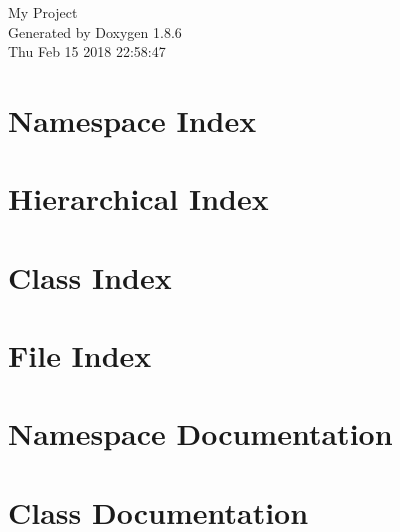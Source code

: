 \documentclass[twoside]{book}
\newcommand{\clearemptydoublepage}{%
  \newpage{\pagestyle{empty}\cleardoublepage}%
}
\begin{document}
\hypersetup{pageanchor=false}
\begin{titlepage}
\vspace*{7cm}
\begin{center}%
{\Large My Project }\\
\vspace*{1cm}
{\large Generated by Doxygen 1.8.6}\\
\vspace*{0.5cm}
{\small Thu Feb 15 2018 22:58:47}\\
\end{center}
\end{titlepage}
\clearemptydoublepage
\tableofcontents
\clearemptydoublepage
{}
\hypersetup{pageanchor=true}

\chapter{Namespace Index}

\chapter{Hierarchical Index}

\chapter{Class Index}

\chapter{File Index}

\chapter{Namespace Documentation}


\chapter{Class Documentation}















\end{document}
